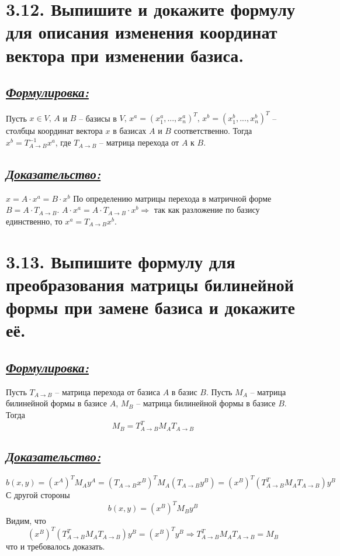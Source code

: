 \documentclass{article}
\begin{document}
\section*{\LARGE 3.12. Выпишите и докажите формулу для описания изменения координат вектора при изменении базиса. }
\subsection*{\Large \underline{\textit{Формулировка: }}}
Пусть $x \in V,\, A$ и $B$ -- базисы в $V, \, x^a = (x_1^a, ..., x_n^a)^T, \, x^b = (x_1^b, ..., x_n^b)^T$ -- столбцы координат вектора $x$ в базисах $A$ и $B$ соответственно. Тогда $x^b = T_{A \rightarrow B}^{-1} x^a$, где $T_{A \rightarrow B}$ -- матрица перехода от $A$ к $B$.

\subsection*{\Large \underline{\textit{Доказательство: }}}
$x = A \cdot x^a = B \cdot x^b$
\newline По определению матрицы перехода в матричной форме $B = A \cdot T_{A \rightarrow B}$.
\newline $A \cdot x^a = A \cdot T_{A \rightarrow B} \cdot x^b \Rightarrow$ так как разложение по базису единственно, то $x^a = T_{A \rightarrow B} x^b$.

\section*{\LARGE 3.13. Выпишите формулу для преобразования матрицы билинейной формы при замене базиса и докажите её. }
\subsection*{\Large \underline{\textit{Формулировка: }}}
Пусть $T_{A \rightarrow B}$ -- матрица перехода от базиса $A$ в базис $B$. Пусть $M_A$ -- матрица билинейной формы в базисе $A$, $M_B$ -- матрица билинейной формы в базисе $B$. Тогда 
$$
M_B = T_{A \rightarrow B}^T M_A T_{A \rightarrow B}
$$

\subsection*{\Large \underline{\textit{Доказательство: }}}
$$b(x, y) = (x^{A})^T M_A y^A = (T_{A \rightarrow B}x^{B})^T M_A (T_{A \rightarrow B} y^B) = 
(x^{B})^T (T_{A \rightarrow B}^T M_A T_{A \rightarrow B}) y^B$$
С другой стороны 
$$b(x, y) = (x^{B})^T M_B y^B$$
Видим, что 
$$
(x^{B})^T (T_{A \rightarrow B}^T M_A T_{A \rightarrow B}) y^B = (x^{B})^T  y^B \Rightarrow
T_{A \rightarrow B}^T M_A T_{A \rightarrow B} = M_B
$$
что и требовалось доказать.
\end{document}
